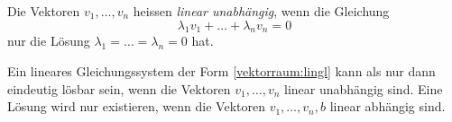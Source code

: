 \begin{definition}
Die Vektoren $v_1,\dots,v_n$ heissen {\em linear unabhängig}, wenn die
Gleichung
\[
\lambda_1v_1 + \dots + \lambda_nv_n=0
\]
nur die Lösung $\lambda_1=\dots=\lambda_n=0$ hat.
\end{definition}

Ein lineares Gleichungssystem der Form \eqref{vektorraum:lingl}
kann als nur dann eindeutig lösbar sein, wenn die Vektoren
$v_1,\dots,v_n$ linear unabhängig sind.
Eine Lösung wird nur existieren, wenn die Vektoren
$v_1,\dots,v_n,b$ linear abhängig sind.


